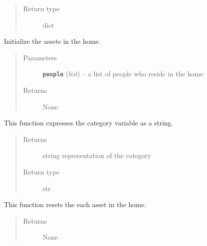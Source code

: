\documentclass[letterpaper,10pt,english]{sphinxmanual}
\begin{document}
\begin{fulllineitems}
\begin{fulllineitems}
\begin{quote}
\begin{description}
\item[{Return type}] \leavevmode
dict

\end{description}\end{quote}

\end{fulllineitems}


\begin{fulllineitems}
\label{home:home.Home.initialize}
Initialize the assets in the home.
\begin{quote}\begin{description}
\item[{Parameters}] \leavevmode
\textbf{\texttt{people}} (\emph{list}) -- a list of people who reside in the home

\item[{Returns}] \leavevmode
None

\end{description}\end{quote}

\end{fulllineitems}


\begin{fulllineitems}
\label{home:home.Home.print_category}
This function expresses the category variable as a string.
\begin{quote}\begin{description}
\item[{Returns}] \leavevmode
string representation of the category

\item[{Return type}] \leavevmode
str

\end{description}\end{quote}

\end{fulllineitems}


\begin{fulllineitems}
\label{home:home.Home.reset}
This function resets the each asset in the home.
\begin{quote}\begin{description}
\item[{Returns}] \leavevmode
None


\end{description}
\end{quote}
\end{fulllineitems}
\end{fulllineitems}
\end{document}
